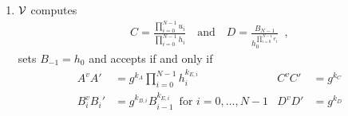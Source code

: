 \begin{nicebox}
\begin{protocol}
\begin{enumerate}
  \item $\mathcal{V}$ computes
    \begin{align*}
      C=\frac{\prod\nolimits_{i=0}^{N-1}u_i}{\prod\nolimits_{i=0}^{N-1}h_i}\quad\text{and}\quad D=\frac{B_{N-1}}{h_0^{\prod_{i=0}^{N-1}e_i}}\enspace,
    \end{align*}
    sets $B_{-1}=h_0$ and accepts if and only if
    \begin{align*}
      A^vA'&=g^{k_A}\prod\nolimits_{i=0}^{N-1}h_i^{k_{E,i}}
      &C^vC'&=g^{k_C}\\
      B_i^vB_i'&=g^{k_{B,i}}B_{i-1}^{k_{E,i}}\enspace\text{for $i=0,\ldots,N-1$}
      &D^vD'&=g^{k_D}
    \end{align*}

  \end{enumerate}
  
\end{protocol}
\end{nicebox}

